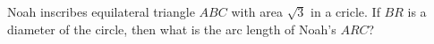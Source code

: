 Noah inscribes equilateral triangle $ABC$ with area $\sqrt3$ in a cricle. If $BR$ is a diameter of the circle, then what is the arc length of Noah's $ARC$?
